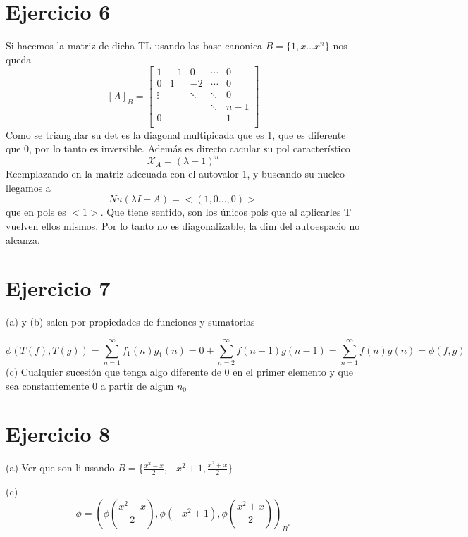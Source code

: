 \documentclass{article}
\theoremstyle{break}
\begin{document}
\section{Ejercicio 6}
	Si hacemos la matriz de dicha TL usando las base canonica $B = \{ 1,x\ldots x^{n} \} $ nos queda 
	\[
	[A]_{B} =
	\left[ {\begin{array}{ccccc}
	1 & -1 & 0 & \cdots & 0\\
	0 & 1 & -2 & \cdots & 0  \\
	\vdots & & \ddots & \ddots & 0\\
	 & & & \ddots & n-1\\
	0 & & & & 1\\
	\end{array} } \right]
	\]
	Como se triangular su det es la diagonal multipicada que es 1, que es diferente que 0, por lo tanto es inversible.
	Además es directo cacular su pol característico 
	\[ \mathcal{X}_{A}= {(\lambda -1)}^{n}\] 
	Reemplazando en la matriz adecuada con el autovalor 1, y buscando su nucleo llegamos a 
	\[Nu(\lambda I - A) = <(1,0\ldots,0)>\] que en pols es $<1>$. Que tiene sentido, son los únicos pols que al aplicarles T vuelven ellos mismos. Por lo tanto no es diagonalizable, la dim del autoespacio no alcanza.

	\section{Ejercicio 7}
	(a) y (b) salen por propiedades de funciones y sumatorias

	\[
		\phi(T(f),T(g)) = \sum_{n=1}^{\infty} f_1(n)g_1(n) = 0 + \sum_{n=2}^{\infty} f(n-1)g(n-1) = \sum_{n=1}^{\infty} f(n)g(n) = \phi
		(f,g)
	\]
	(c) Cualquier sucesión que tenga algo diferente de 0 en el primer elemento y que sea constantemente 0 a partir de algun $n_0$

	\section{Ejercicio 8}
	(a) Ver que son li usando $B = \{\frac{x^2 -x}{2},-x^2+1,\frac{x^2 + x}{2}\}$

	(c) \[
		\phi = (\phi(\frac{x^2 -x}{2}),\phi(-x^2+1),\phi(\frac{x^2 + x}{2}))_{B^*}
	\]
\end{document}

